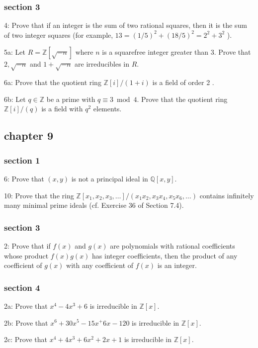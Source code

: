 \documentclass{article}
\begin{document}
\subsubsection*{section 3}
4: Prove that if an integer is the sum of two rational squares, then it is the sum of two integer squares (for example, $13=(1 / 5)^{2}+(18 / 5)^{2}=2^{2}+3^{2}$ ).

5a: Let $R=\mathbb{Z}[\sqrt{-n}]$ where $n$ is a squarefree integer greater than 3. Prove that $2, \sqrt{-n}$ and $1+\sqrt{-n}$ are irreducibles in $R$.

6a: Prove that the quotient ring $\mathbb{Z}[i] /(1+i)$ is a field of order 2 .

6b: Let $q \in \mathbb{Z}$ be a prime with $q \equiv 3 \bmod 4$. Prove that the quotient ring $\mathbb{Z}[i] /(q)$ is a field with $q^{2}$ elements.

\subsection*{chapter 9}
\subsubsection*{section 1}
6: Prove that $(x, y)$ is not a principal ideal in $\mathbb{Q}[x, y]$.

10: Prove that the ring $\mathbb{Z}\left[x_{1}, x_{2}, x_{3}, \ldots\right] /\left(x_{1} x_{2}, x_{3} x_{4}, x_{5} x_{6}, \ldots\right)$ contains infinitely many minimal prime ideals (cf. Exercise 36 of Section 7.4).

\subsubsection*{section 3}
2: Prove that if $f(x)$ and $g(x)$ are polynomials with rational coefficients whose product $f(x) g(x)$ has integer coefficients, then the product of any coefficient of $g(x)$ with any coefficient of $f(x)$ is an integer.

\subsubsection*{section 4}
2a: Prove that $x^4-4x^3+6$ is irreducible in $\mathbb{Z}[x]$. 

2b: Prove that $x^6+30x^5-15x^+6x-120$ is irreducible in $\mathbb{Z}[x]$. 

2c: Prove that $x^4+4x^3+6x^2+2x+1$ is irreducible in $\mathbb{Z}[x]$. 
\end{document}
